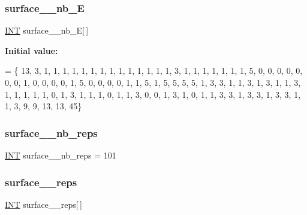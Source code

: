 \mbox{\label{surface__64_8_c_ae09c58bd2f1fcddeda7e2f25b0475178}} 
\subsubsection{\texorpdfstring{surface\+\_\+\_\+nb\+\_\+E}{surface\_64\_nb\_E}}
{\footnotesize\ttfamily \mbox{\hyperlink{galois_8h_a09fddde158a3a20bd2dcadb609de11dc}{I\+NT}} surface\+\_\+\_\+nb\+\_\+E\mbox{[}$\,$\mbox{]}}

{\bfseries Initial value\+:}
\begin{DoxyCode}
= \{ 
    13, 3, 1, 1, 1, 1, 1, 1, 1, 1, 
    1, 1, 1, 1, 1, 1, 3, 1, 1, 1, 
    1, 1, 1, 1, 5, 0, 0, 0, 0, 0, 
    0, 0, 1, 0, 0, 0, 0, 1, 5, 0, 
    0, 0, 0, 1, 1, 5, 1, 5, 5, 5, 
    5, 1, 3, 3, 1, 1, 3, 1, 3, 1, 
    1, 3, 1, 1, 1, 1, 1, 0, 1, 3, 
    1, 1, 1, 0, 1, 1, 3, 0, 0, 1, 
    3, 1, 0, 1, 1, 3, 3, 1, 3, 3, 
    1, 3, 3, 1, 1, 3, 9, 9, 13, 13, 
    45\}
\end{DoxyCode}
\mbox{\label{surface__64_8_c_a1a992b5751885ab63dc34eef564dead1}} 
\subsubsection{\texorpdfstring{surface\+\_\+\_\+nb\+\_\+reps}{surface\_64\_nb\_reps}}
{\footnotesize\ttfamily \mbox{\hyperlink{galois_8h_a09fddde158a3a20bd2dcadb609de11dc}{I\+NT}} surface\+\_\+\_\+nb\+\_\+reps = 101}

\mbox{\label{surface__64_8_c_a1093672a214cd7263736af35948501c4}} 
\subsubsection{\texorpdfstring{surface\+\_\+\_\+reps}{surface\_64\_reps}}
{\footnotesize\ttfamily \mbox{\hyperlink{galois_8h_a09fddde158a3a20bd2dcadb609de11dc}{I\+NT}} surface\+\_\+\_\+reps\mbox{[}$\,$\mbox{]}}


